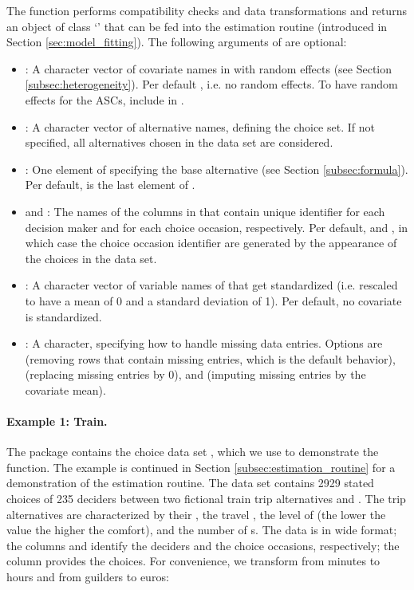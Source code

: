 \documentclass[article]{jss}
\newcommand{\class}[1]{`\code{#1}'}
\newcommand{\fct}[1]{\code{#1()}}
\begin{document}
The function performs compatibility checks and data transformations and returns an object of class \class{RprobitB\_data} that can be fed into the estimation routine \fct{fit\_model} (introduced in Section \ref{sec:model_fitting}). The following arguments of \fct{prepare\_data} are optional:
\begin{itemize}
  \item {}: A character vector of covariate names in  with random effects (see Section \ref{subsec:heterogeneity}). Per default , i.e. no random effects. To have random effects for the ASCs, include  in .
  \item {}: A character vector of alternative names, defining the choice set. If not specified, all alternatives chosen in the data set are considered.
  \item {}: One element of  specifying the base alternative (see Section \ref{subsec:formula}). Per default,  is the last element of .
  \item {} and : The names of the columns in  that contain unique identifier for each decision maker and for each choice occasion, respectively. Per default,  and , in which case the choice occasion identifier are generated by the appearance of the choices in the data set.
  \item {}: A character vector of variable names of  that get standardized (i.e. rescaled to have a mean of 0 and a standard deviation of 1). Per default, no covariate is standardized.
  \item {}: A character, specifying how to handle missing data entries. Options are  (removing rows that contain missing entries, which is the default behavior),  (replacing missing entries by 0), and  (imputing missing entries by the covariate mean).
\end{itemize}

\paragraph{Example 1: Train.}

The  package contains the choice data set , which we use to demonstrate the \fct{prepare\_data} function. The example is continued in Section \ref{subsec:estimation_routine} for a demonstration of the estimation routine. The data set contains 2929 stated choices of 235 deciders between two fictional train trip alternatives  and . The trip alternatives are characterized by their , the travel , the level of  (the lower the value the higher the comfort), and the number of s. The data is in wide format; the columns  and  identify the deciders and the choice occasions, respectively; the column  provides the choices. For convenience, we transform  from minutes to hours and  from guilders to euros:
\end{document}
